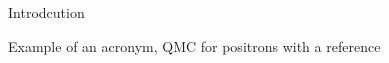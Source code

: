 Introdcution

\lipsum[1] %
\lipsum[2] %

Example of an acronym, \ac{QMC} for positrons with a reference \cite{Bressanini2021}

